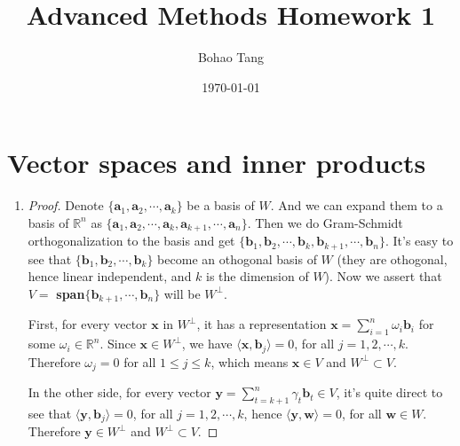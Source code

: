 \documentclass[12pt]{article}
\title{Advanced Methods Homework 1}
\date{\today}
\author{Bohao Tang}
\begin{document}
\maketitle

\section{Vector spaces and inner products}
\begin{enumerate}
   \item
   \begin{proof}
        Denote $\{\textbf{a}_1,\textbf{a}_2,\cdots,\textbf{a}_k\}$ be a basis of $W$.
        And we can expand them to a basis of $\mathbb{R}^n$ as $\{\textbf{a}_1,\textbf{a}_2,\cdots,\textbf{a}_k,\textbf{a}_{k+1},\cdots,\textbf{a}_n\}$.
        Then we do Gram-Schmidt orthogonalization to the basis and get 
        $\{\textbf{b}_1,\textbf{b}_2,\cdots,\textbf{b}_k,\textbf{b}_{k+1},\cdots,\textbf{b}_n\}$.
        It's easy to see that $\{\textbf{b}_1,\textbf{b}_2,\cdots,\textbf{b}_k\}$ become an othogonal basis of $W$
        (they are othogonal, hence linear independent, and $k$ is the dimension of $W$).
        Now we assert that $V = $ \textbf{span}$\{\textbf{b}_{k+1},\cdots,\textbf{b}_n\}$ will be $W^\bot$.
       
        First, for every vector $\textbf{x}$ in $W^\bot$, it has a representation $\textbf{x} = \sum_{i=1}^n \omega_i \textbf{b}_i$ for some $\omega_i \in \mathbb{R}^n$.
        Since $\textbf{x} \in W^\bot$, we have $\langle \textbf{x} , \textbf{b}_j \rangle = 0$, for all $j = 1,2,\cdots,k$.
        Therefore $\omega_j = 0$ for all $1 \le j \le k$, which means $\textbf{x} \in V$ and $W^\bot \subset V$.
        
        In the other side, for every vector $\textbf{y} = \sum_{t=k+1}^n \gamma_t \textbf{b}_t \in V$, it's quite direct to see that $\langle \textbf{y} , \textbf{b}_j \rangle = 0$, for all $j = 1,2,\cdots,k$,
        hence $\langle \textbf{y} , \textbf{w} \rangle = 0$, for all $\textbf{w} \in W$.
        Therefore $\textbf{y} \in W^\bot$ and $W^\bot \subset V$.


\end{proof}
\end{enumerate}
\end{document}
